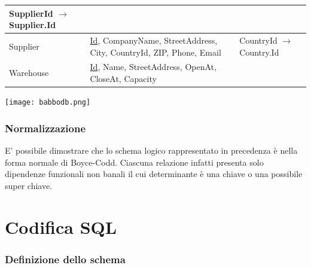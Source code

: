 \documentclass[12pt]{report}
\begin{document}
\begin{tabular}{|p{}|p{}|p{}|}
SupplierId $\rightarrow$ Supplier.Id \\
\hline
Supplier & \underline{Id}, CompanyName, StreetAddress, City, CountryId, ZIP, Phone, Email & CountryId $\rightarrow$ Country.Id \\
\hline
Warehouse & \underline{Id}, Name, StreetAddress, OpenAt, CloseAt, Capacity &  \\ 
\hline

\end{tabular}

\begin{center}
    \texttt{[image: babbodb.png]}
\end{center}

\subsection{Normalizzazione}
E' possibile dimostrare che lo schema logico rappresentato in precedenza è nella forma normale di Boyce-Codd.
Ciascuna relazione infatti presenta solo dipendenze funzionali non banali il cui determinante è una chiave o
una possibile super chiave.

\chapter{Codifica SQL}
\subsection{Definizione dello schema}
\end{document}

